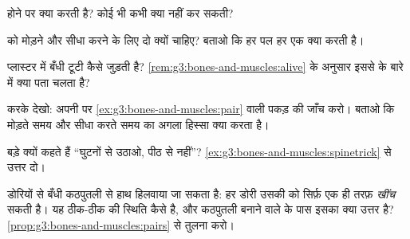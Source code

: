 \begin{exercise}[$\star$]\label{exo:g3:bones-and-muscles:5}
  होने पर क्या करती है? कोई भी  कभी क्या नहीं कर सकती?
\end{exercise}

\begin{exercise}[$\star$]\label{exo:g3:bones-and-muscles:6}
 को मोड़ने और सीधा करने के लिए दो  क्यों चाहिए? बताओ कि हर
पल हर एक क्या करती है।
\end{exercise}

\begin{exercise}[$\star$]\label{exo:g3:bones-and-muscles:7}
प्लास्टर में बँधी टूटी  कैसे जुड़ती है?
\cref{rem:g3:bones-and-muscles:alive} के अनुसार इससे  के बारे में
क्या पता चलता है?
\end{exercise}

\begin{exercise}[$\star$]\label{exo:g3:bones-and-muscles:8}
करके देखो: अपनी  पर \cref{ex:g3:bones-and-muscles:pair} वाली पकड़
की जाँच करो। बताओ कि मोड़ते समय और सीधा करते समय  का अगला हिस्सा
क्या करता है।
\end{exercise}

\begin{exercise}[$\star\star$]\label{exo:g3:bones-and-muscles:9}
बड़े क्यों कहते हैं ``घुटनों से उठाओ, पीठ से नहीं''?
\cref{ex:g3:bones-and-muscles:spinetrick} से उत्तर दो।
\end{exercise}

\begin{exercise}[$\star\star$]\label{exo:g3:bones-and-muscles:10}
डोरियों से बँधी कठपुतली से हाथ हिलवाया जा सकता है: हर डोरी उसकी 
को सिर्फ़ एक ही तरफ़ \emph{खींच} सकती है। यह ठीक-ठीक  की स्थिति
कैसे है, और कठपुतली बनाने वाले के पास इसका क्या उत्तर है?
\cref{prop:g3:bones-and-muscles:pairs} से तुलना करो।
\end{exercise}
